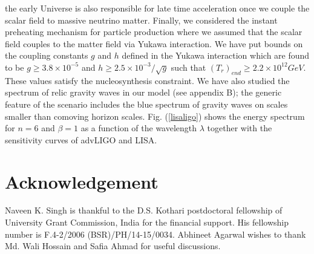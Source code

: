 \documentclass[prd,twocolumn,superscriptaddress]{revtex4}
\begin{document}
 the early Universe is also responsible for late time acceleration once we couple the scalar field to massive neutrino matter. Finally, we considered the instant preheating mechanism for
  particle production where  we assumed  that the scalar field couples to the matter field via Yukawa interaction. We have
 put bounds on the coupling constants $g$ and $h$ defined in the Yukawa interaction which are found
 to be $g \geq 3.8 \times 10^{-5}$ and $h \geq 2.5 \times  10^{-3}/\sqrt{g}$ such that $(T_r)_{end} \geq 2.2 \times 10^{12} GeV$.
 These values satisfy the nucleosynthesis constraint.  We have also studied the spectrum of relic gravity waves in our model (see appendix B); the generic feature of 
 the scenario includes the blue spectrum of gravity waves on scales smaller than comoving horizon scales. Fig. (\ref{lisaligo})
 shows the energy spectrum for   $n = 6$ and $\beta = 1$ as a function of the wavelength $\lambda$ together with the sensitivity 
 curves of advLIGO and LISA.
 \vspace{-.7cm} 
 \section*{Acknowledgement}
 Naveen K. Singh is thankful to the D.S. Kothari postdoctoral fellowship of University Grant Commission, India for the financial
 support. His fellowship number is F.4-2/2006 (BSR)/PH/14-15/0034. Abhineet Agarwal wishes to thank Md. Wali Hossain and Safia Ahmad for
 useful discussions.
 \vspace{-.3cm} 
\end{document}
